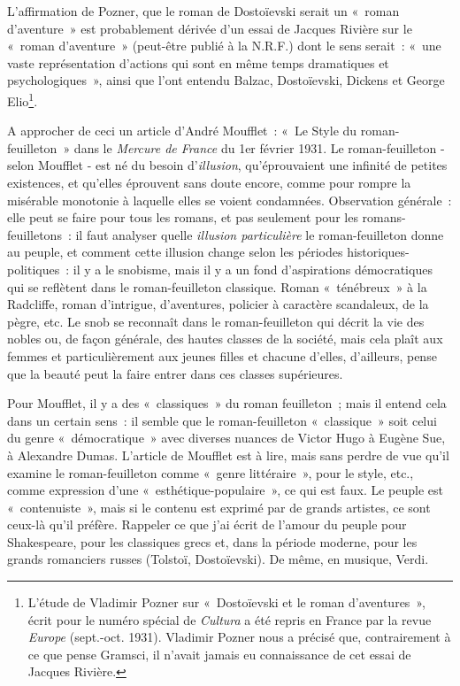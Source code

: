 \documentclass[french,twoside]{book} %
\begin{document}
\noindent L'affirmation de Pozner, que le roman de Dostoïevski serait un « roman d’aventure » est probablement dérivée d’un essai de Jacques Rivière sur le « roman d’aventure » (peut-être publié à la N.R.F.) dont le sens serait : « une vaste représentation d’actions qui sont en même temps dramatiques et psychologiques », ainsi que l’ont entendu Balzac, Dostoïevski, Dickens et George Elio\footnote{L'étude de Vladimir Pozner sur « Dostoïevski et le roman d’aventures », écrit pour le numéro spécial de \emph{Cultura} a été repris en France par la revue \emph{Europe} (sept.-oct. 1931). Vladimir Pozner nous a précisé que, contrairement à ce que pense Gramsci, il n’avait jamais eu connaissance de cet essai de Jacques Rivière.}.\par
{\raggedleft \noindent [1934-1935]\par}
\noindent A approcher de ceci un article d’André Moufflet : « Le Style du roman-feuilleton » dans le \emph{Mercure de France} du 1er février 1931. Le roman-feuilleton - selon Moufflet - est né du besoin d’\emph{illusion}, qu’éprouvaient une infinité de petites existences, et qu’elles éprouvent sans doute encore, comme pour rompre la misérable monotonie à laquelle elles se voient condamnées. Observation générale : elle peut se faire pour tous les romans, et pas seulement pour les romans-feuilletons : il faut analyser quelle \emph{illusion particulière} le roman-feuilleton donne au peuple, et comment cette illusion change selon les périodes historiques-politiques : il y a le snobisme, mais il y a un fond d’aspirations démocratiques qui se reflètent dans le roman-feuilleton classique. Roman « ténébreux » à la Radcliffe, roman d’intrigue, d’aventures, policier à caractère scandaleux, de la pègre, etc. Le snob se reconnaît dans le roman-feuilleton qui décrit la vie des nobles ou, de façon générale, des hautes classes de la société, mais cela plaît aux femmes et particulièrement aux jeunes filles et chacune d’elles, d’ailleurs, pense que la beauté peut la faire entrer dans ces classes supérieures.\par
Pour Moufflet, il y a des « classiques » du roman feuilleton ; mais il entend cela dans un certain sens : il semble que le roman-feuilleton « classique » soit celui du genre « démocratique » avec diverses nuances de Victor Hugo à Eugène Sue, à Alexandre Dumas. L'article de Moufflet est à lire, mais sans perdre de vue qu’il examine le roman-feuilleton comme « genre littéraire », pour le style, etc., comme expression d’une « esthétique-populaire », ce qui est faux. Le peuple est « contenuiste », mais si le contenu est exprimé par de grands artistes, ce sont ceux-là qu’il préfère. Rappeler ce que j’ai écrit de l’amour du peuple pour Shakespeare, pour les classiques grecs et, dans la période moderne, pour les grands romanciers russes (Tolstoï, Dostoïevski). De même, en musique, Verdi.\par
\end{document}
